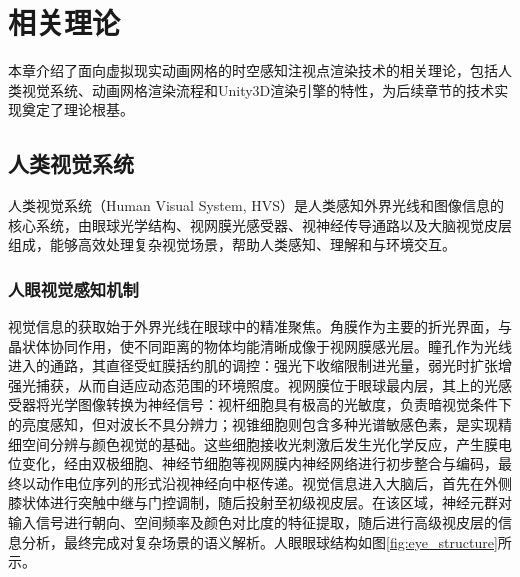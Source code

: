 \chapter{相关理论}
本章介绍了面向虚拟现实动画网格的时空感知注视点渲染技术的相关理论，包括人类视觉系统、动画网格渲染流程和Unity3D渲染引擎的特性，为后续章节的技术实现奠定了理论根基。

\section{人类视觉系统}
人类视觉系统（Human Visual System, HVS）是人类感知外界光线和图像信息的核心系统，由眼球光学结构、视网膜光感受器、视神经传导通路以及大脑视觉皮层组成，能够高效处理复杂视觉场景，帮助人类感知、理解和与环境交互。

\subsection{人眼视觉感知机制}
视觉信息的获取始于外界光线在眼球中的精准聚焦。角膜作为主要的折光界面，与晶状体协同作用，使不同距离的物体均能清晰成像于视网膜感光层\cite{2-1}。瞳孔作为光线进入的通路，其直径受虹膜括约肌的调控：强光下收缩限制进光量，弱光时扩张增强光捕获，从而自适应动态范围的环境照度。视网膜位于眼球最内层，其上的光感受器将光学图像转换为神经信号：视杆细胞具有极高的光敏度，负责暗视觉条件下的亮度感知，但对波长不具分辨力；视锥细胞则包含多种光谱敏感色素，是实现精细空间分辨与颜色视觉的基础。这些细胞接收光刺激后发生光化学反应，产生膜电位变化，经由双极细胞、神经节细胞等视网膜内神经网络进行初步整合与编码，最终以动作电位序列的形式沿视神经向中枢传递。视觉信息进入大脑后，首先在外侧膝状体进行突触中继与门控调制，随后投射至初级视皮层。在该区域，神经元群对输入信号进行朝向、空间频率及颜色对比度的特征提取，随后进行高级视皮层的信息分析，最终完成对复杂场景的语义解析。人眼眼球结构如图\ref{fig:eye_structure}所示\cite{2-2}。



